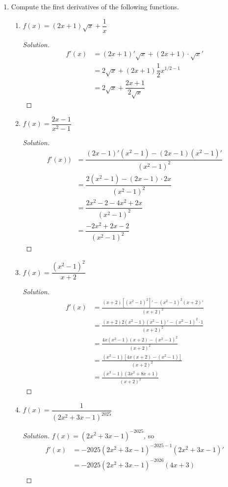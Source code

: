 \documentclass[12pt]{article}
\newenvironment{solution}{\begin{proof}[Solution]}{\end{proof}}
\begin{document}
\begin{enumerate}
\begin{solution}
		Therefore, the equation of the tangent line is $y-4=4(x-1)$ or $y=4x$.
	\end{solution}
	\item Compute the first derivatives of the following functions. 
	\begin{enumerate}
		\item $f(x)=(2x+1)\sqrt{x}+\dfrac{1}{x}$
		\begin{solution}
			\begin{align*}
				f'(x)&=(2x+1)'\sqrt{x}+(2x+1)\cdot \sqrt{x}'\\
				&= 2\sqrt{x}+(2x+1)\dfrac{1}{2}x^{1/2-1}\\
				&=2\sqrt{x}+\dfrac{2x+1}{2\sqrt{x}}
			\end{align*}
		\end{solution}
		\item $f(x)=\dfrac{2x-1}{x^2-1}$
		\begin{solution}
			\begin{align*}
				f'(x))&=\dfrac{(2x-1)'(x^2-1)-(2x-1)(x^2-1)'}{(x^2-1)^2}\\
				&=\dfrac{2(x^2-1)-(2x-1)\cdot 2x}{(x^2-1)^2}\\
				&=\dfrac{2x^2-2-4x^2+2x}{(x^2-1)^2}\\
				&=\dfrac{-2x^2+2x-2}{(x^2-1)^2}
			\end{align*}
		\end{solution}
		\item $f(x)=\dfrac{(x^{2}-1)^2}{x+2}$
		\begin{solution}
			\begin{align*}
				f'(x)&=\frac{(x+2)[(x^{2}-1)^2]'-(x^{2}-1)^2(x+2)'}{(x+2)^2}\\
				&=\frac{(x+2)2(x^2-1)(x^2-1)'-(x^2-1)^2\cdot 1}{(x+2)^2}\\
				&=\frac{4x(x^{2}-1)(x+2)-(x^{2}-1)^2}{(x+2)^2}\\
				&=\frac{(x^{2}-1)\left[4x(x+2)-(x^{2}-1)\right]}{(x+2)^2}\\
				&=\frac{(x^{2}-1)(3x^{2}+8x+1)}{(x+2)^2}
			\end{align*}
		\end{solution}
		\item $f(x)=\dfrac{1}{(2x^{2}+3x-1)^{2025}}$
		\begin{solution}
			$f(x)=(2x^2+3x-1)^{-2025}$, so
			\begin{align*}
				f'(x)&=-2025(2x^2+3x-1)^{-2025-1}(2x^2+3x-1)'\\
				&=-2025(2x^2+3x-1)^{-2026}(4x+3)\\

\end{align*}
\end{solution}
\end{enumerate}
\end{enumerate}
\end{document}

